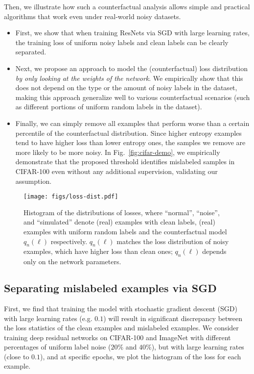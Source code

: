 \documentclass[a4paper,11pt]{article}
\begin{document}
Then, we illustrate how such a counterfactual analysis allows simple and practical algorithms that work even under real-world noisy datasets.
\begin{itemize}
    \item First, we show that when training ResNets via SGD with large learning rates, the training loss of uniform noisy labels and clean labels can be clearly separated.
    \item Next, we propose an approach to model the (counterfactual) loss distribution 
\textit{by only looking at the weights of the network}. We empirically show that this does not depend on the type or the amount of noisy labels in the dataset, making this approach generalize well to various counterfactual scenarios (such as different portions of uniform random labels in the dataset).
    \item Finally, we can simply remove all examples that perform worse than a certain percentile of the counterfactual distribution. Since higher entropy examples tend to have higher loss than lower entropy ones, the samples we remove are more likely to be more noisy. In Fig.~\ref{fig:cifar-demo}, we empirically demonstrate that the proposed threshold identifies mislabeled samples in CIFAR-100 even without any additional supervision, validating our assumption.
\end{itemize}

\begin{figure*}[t]
\begin{center}
\texttt{[image: figs/loss-dist.pdf]}
\caption{Histogram of the distributions of losses, where ``normal'', ``noise'', and ``simulated'' denote (real) examples with clean labels, (real) examples with uniform random labels and the counterfactual model $q_n(\ell)$ respectively. $q_n(\ell)$ matches the loss distribution of noisy examples, which have higher loss than clean ones; $q_n(\ell)$ depends only on the network parameters.}
\label{fig:histogram}
\end{center}
\end{figure*}





\subsection{Separating mislabeled examples via SGD}



First, we find that training the model with stochastic gradient descent (SGD) with large learning rates (e.g. $0.1$) will result in significant discrepancy between the loss statistics of the clean examples and mislabeled examples. We consider training deep residual networks on CIFAR-100 and ImageNet with different percentages of uniform label noise ($20\%$ and $40\%$), but with large learning rates (close to $0.1$), and at specific epochs, we plot the histogram of the loss for each example. 
\end{document}
